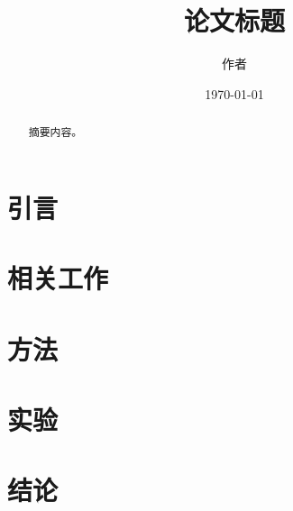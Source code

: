 \documentclass[12pt,a4paper]{article}
\title{论文标题}
\author{作者}
\date{\today}
\begin{document}
\maketitle
\begin{abstract}
摘要内容。
\end{abstract}

\section{引言}

\section{相关工作}

\section{方法}

\section{实验}

\section{结论}
\end{document}
